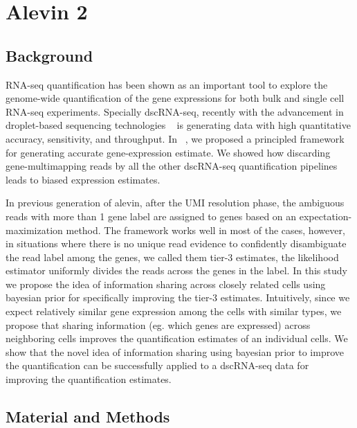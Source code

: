 
\chapter{Alevin 2} %

\label{alevin2} %


\section{Background}

RNA-seq quantification has been shown as an important tool to explore the genome-wide
quantification of the gene expressions for both bulk and single cell RNA-seq experiments.
Specially dscRNA-seq, recently with the advancement in droplet-based sequencing technologies
~\citet{dropseq, indrop, tenx} is generating data with high quantitative accuracy,
sensitivity, and throughput. In ~, we proposed a principled framework for 
generating accurate gene-expression estimate. We showed how discarding gene-multimapping 
reads by all the other dscRNA-seq quantification pipelines leads to biased expression estimates. 

In previous generation of alevin, after the UMI resolution phase, the ambiguous reads with more 
than 1 gene label are assigned to genes based on an expectation-maximization method. The 
framework works well in most of the cases, however, in situations where there is no unique 
read evidence to confidently disambiguate the read label among the genes, we called them 
tier-3 estimates, the likelihood estimator uniformly divides the reads across the genes in the 
label. In this study we propose the idea of information sharing across closely related cells 
using bayesian prior for specifically improving the tier-3 estimates. Intuitively, since we expect 
relatively similar gene expression among the cells with similar types, we propose that sharing 
information (eg. which genes are expressed) across neighboring cells improves the quantification 
estimates of an individual cells. We show that the novel idea of information sharing using bayesian 
prior to improve the quantification can be successfully applied to a dscRNA-seq data for improving the 
quantification estimates.

\section{Material and Methods}
\label{sec:alv2_methods}

